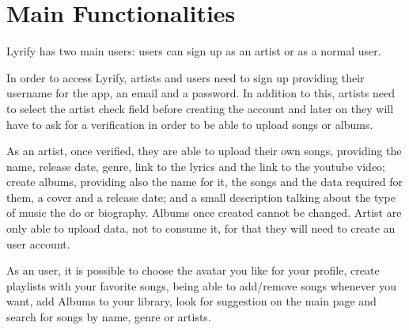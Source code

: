 \section{Main Functionalities}

Lyrify has two main users: users can sign up as an artist or as a normal user.

In order to access Lyrify, artists and users need to sign up providing their username for the app, an email and a password. In addition to this, artists need to select the artist check field before creating the account and later on they will have to ask for a verification in order to be able to upload songs or albums. 

As an artist, once verified, they are able to upload their own songs, providing the name, release date, genre, link to the lyrics and the link to the youtube video; create albums, providing also the name for it, the songs and the data required for them, a cover and a release date; and a small description talking about the type of music the do or biography. Albums once created cannot be changed. Artist are only able to upload data, not to consume it, for that they will need to create an user account. 

As an user, it is possible to choose the avatar you like for your profile, create playlists with your favorite songs, being able to add/remove songs whenever you want, add Albums to your library, look for suggestion on the main page and search for songs by name, genre or artists.
